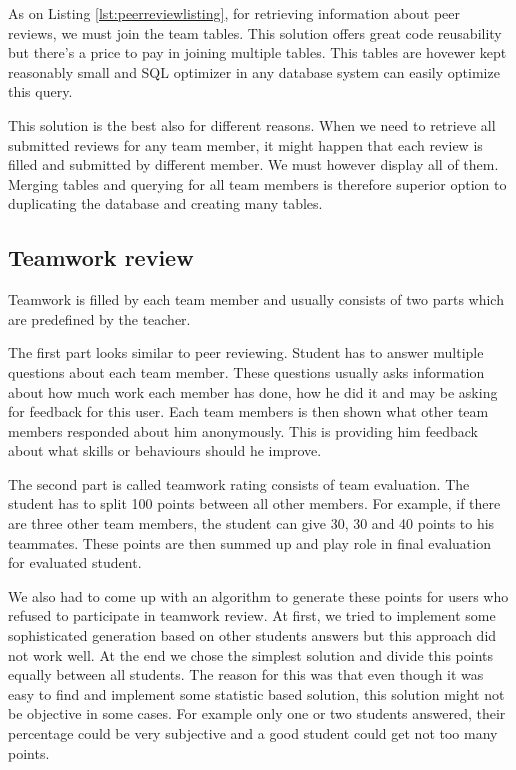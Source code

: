As on Listing \ref{lst:peerreviewlisting}, for retrieving information about peer reviews, we must join the team tables. This solution offers great code reusability but there's a price to pay in joining multiple tables. This tables are hovewer kept reasonably small and SQL optimizer in any database system can easily optimize this query.

This solution is the best also for different reasons. When we need to retrieve all submitted reviews for any team member, it might happen that each review is filled and submitted by different member. We must however display all of them. Merging tables and querying for all team members is therefore superior option to duplicating the database and creating many tables.  

\subsection{Teamwork review}
\label{sec:teamreview}
Teamwork is filled by each team member and usually consists of two parts which are predefined by the teacher. 

The first part looks similar to peer reviewing. Student has to answer multiple questions about each team member. These questions usually asks information about how much work each member has done, how he did it and may be asking for feedback for this user. Each team members is then shown what other team members responded about him anonymously. This is providing him feedback about what skills or behaviours should he improve.

The second part is called teamwork rating consists of team evaluation. The student has to split 100 points between all other members. For example, if there are three other team members, the student can give 30, 30 and 40 points to his teammates. These points are then summed up and play role in final evaluation for evaluated student. 

We also had to come up with an algorithm to generate these points for users who refused to participate in teamwork review. At first, we tried to implement some sophisticated generation based on other students answers but this approach did not work well. At the end we chose the simplest solution and divide this points equally between all students. The reason for this was that even though it was easy to find and implement some statistic based solution, this solution might not be objective in some cases. For example only one or two students answered, their percentage could be very subjective and a good student could get not too many points.



